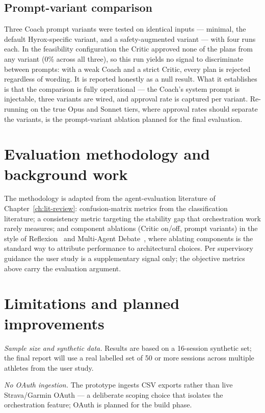 \subsection{Prompt-variant comparison}

Three Coach prompt variants were tested on identical inputs --- minimal, the default Hyrox-specific variant, and a safety-augmented variant --- with four runs each. In the feasibility configuration the Critic approved none of the plans from any variant (0\% across all three), so this run yields no signal to discriminate between prompts: with a weak Coach and a strict Critic, every plan is rejected regardless of wording. It is reported honestly as a null result. What it establishes is that the comparison is fully operational --- the Coach's system prompt is injectable, three variants are wired, and approval rate is captured per variant. Re-running on the true Opus and Sonnet tiers, where approval rates should separate the variants, is the prompt-variant ablation planned for the final evaluation.

\section{Evaluation methodology and background work}

The methodology is adapted from the agent-evaluation literature of Chapter~\ref{ch:lit-review}: confusion-matrix metrics from the classification literature; a consistency metric targeting the stability gap that orchestration work rarely measures; and component ablations (Critic on/off, prompt variants) in the style of Reflexion~\cite{shinn2023reflexion} and Multi-Agent Debate~\cite{du2023debate}, where ablating components is the standard way to attribute performance to architectural choices. Per supervisory guidance the user study is a supplementary signal only; the objective metrics above carry the evaluation argument.

\section{Limitations and planned improvements}

\emph{Sample size and synthetic data.} Results are based on a 16-session synthetic set; the final report will use a real labelled set of 50 or more sessions across multiple athletes from the user study.

\emph{No OAuth ingestion.} The prototype ingests CSV exports rather than live Strava/Garmin OAuth --- a deliberate scoping choice that isolates the orchestration feature; OAuth is planned for the build phase.

